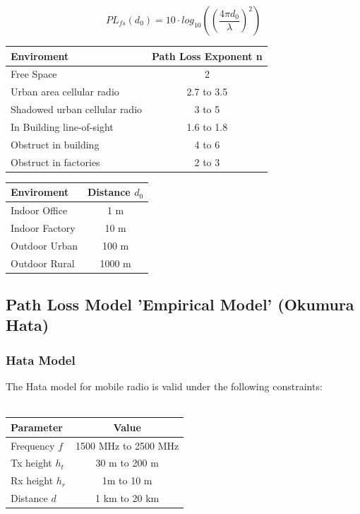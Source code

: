 \begin{equation*}
	PL_{fs}(d_0) = 10\cdot log_{10}((\frac{4\pi d_0}{\lambda})^2)
\end{equation*}

\begin{table}[!htp]
\begin{subtable}[c]{0.6\textwidth}
	\begin{tabular}{|l|c|}
	\hline \textbf{Enviroment} & \textbf{Path Loss Exponent n} \\ \hline
		\hline Free Space & 2 \\ 
		\hline Urban area cellular radio &  2.7 to 3.5\\ 
		\hline Shadowed urban cellular radio &  3 to 5\\ 
		\hline In Building line-of-sight & 1.6 to 1.8 \\ 
		\hline  Obstruct in building& 4 to 6 \\ 
		\hline Obstruct in factories & 2 to 3 \\ 
		\hline 
	\end{tabular}
\end{subtable}
\begin{subtable}[c]{0.4\textwidth}
	\begin{tabular}{|l|c|}
	\hline \textbf{Enviroment} &  \textbf{Distance $d_0$ }\\ \hline
	\hline Indoor Office & 1 m \\ 
	\hline Indoor Factory & 10 m \\ 
	\hline Outdoor Urban & 100 m \\ 
	\hline Outdoor Rural & 1000 m \\ 
	\hline 
	\end{tabular}
\end{subtable}
\end{table}

\subsection{Path Loss Model 'Empirical Model' (Okumura Hata)}
\subsubsection{Hata Model}
The Hata model for mobile radio is valid under the following constraints:\\ \\
\begin{tabular}{|l|c|}
\hline \textbf{Parameter} & \textbf{Value} \\ \hline
\hline Frequency $f$ & 1500 MHz to 2500 MHz \\ 
\hline Tx height $h_t$ & 30 m to 200 m \\ 
\hline Rx height $h_r$ & 1m to 10 m \\ 
\hline Distance $d$ & 1 km to 20 km \\ 
\hline 
\end{tabular} \\ \\

